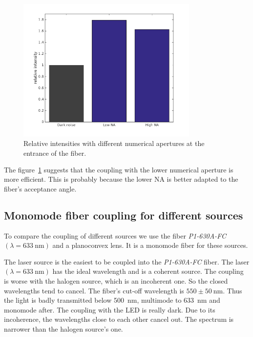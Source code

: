 \documentclass[a4paper, 12pt]{paper}
\begin{document}
\begin{figure}[H]
    \centering
    \includegraphics[width=0.8\textwidth]{img/NA_intensities}
    \caption{Relative intensities with different numerical apertures at the entrance of the fiber.}
\label{fig:NA_intensities}
\end{figure}

The figure~\ref{fig:NA_intensities} suggests that the coupling with the lower numerical aperture is more efficient.
This is probably because the lower NA is better adapted to the fiber's acceptance angle.

\subsection{Monomode fiber coupling for different sources}

To compare the coupling of different sources we use the fiber \emph{P1-630A-FC} $\left( \lambda = \SI{633}{\nano\meter} \right)$ and a planoconvex lens.
It is a monomode fiber for these sources.

The laser source is the easiest to be coupled into the \emph{P1-630A-FC} fiber.
The laser $\left( \lambda = \SI{633}{\nano\meter} \right)$ has the ideal wavelength and is a coherent source.
The coupling is worse with the halogen source, which is an incoherent one.
So the closed wavelengths tend to cancel.
The fiber's cut-off wavelength is $550 \pm \SI{50}{\nano\meter}$.
Thus the light is badly transmitted below \SI{500}{\nano\meter}, multimode to \SI{633}{\nano\meter} and monomode after. 
The coupling with the LED is really dark.
Due to its incoherence, the wavelengths close to each other cancel out.
The spectrum is narrower than the halogen source's one.
\end{document}
